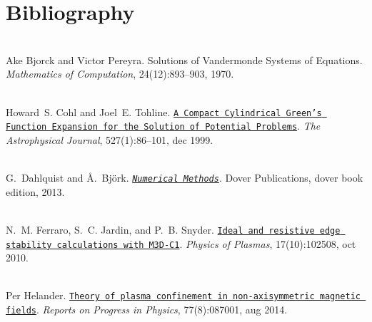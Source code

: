 \chapter{Bibliography }
\hypertarget{citelist}{}\label{citelist}

\begin{DoxyDescription}
\item[{\parbox[t]{\linewidth}{\label{citelist_CITEREF_bjorck1970}%
\Hypertarget{citelist_CITEREF_bjorck1970}%
\+[1]}}]\hfill \\
Ake Bjorck and Victor Pereyra. Solutions of Vandermonde Systems of Equations. {\itshape Mathematics of Computation}, 24(12):893--903, 1970.


\item[{\parbox[t]{\linewidth}{\label{citelist_CITEREF_cohl1999}%
\Hypertarget{citelist_CITEREF_cohl1999}%
\+[2]}}]\hfill \\
Howard~S. Cohl and Joel~E. Tohline. \href{http://stacks.iop.org/0004-637X/527/i=1/a=86}{\texttt{A Compact Cylindrical Green's Function Expansion for the Solution of Potential Problems}}. {\itshape The Astrophysical Journal}, 527(1):86--101, dec 1999. 


\item[{\parbox[t]{\linewidth}{\label{citelist_CITEREF_dahlquist2003numerical}%
\Hypertarget{citelist_CITEREF_dahlquist2003numerical}%
\+[3]}}]\hfill \\
G.~Dahlquist and \AA.~Bj\"{o}rk. \href{http://books.google.es/books?id=armfeHpJIwAC}{\texttt{{\itshape Numerical Methods}}}. Dover Publications, dover book edition, 2013.


\item[{\parbox[t]{\linewidth}{\label{citelist_CITEREF_ferraro2010elmbenchmark}%
\Hypertarget{citelist_CITEREF_ferraro2010elmbenchmark}%
\+[4]}}]\hfill \\
N.~M. Ferraro, S.~C. Jardin, and P.~B. Snyder. \href{http://aip.scitation.org/doi/10.1063/1.3492727}{\texttt{Ideal and resistive edge stability calculations with M3\+D-\/\+C1}}. {\itshape Physics of Plasmas}, 17(10):102508, oct 2010. 


\item[{\parbox[t]{\linewidth}{\label{citelist_CITEREF_helander2014}%
\Hypertarget{citelist_CITEREF_helander2014}%
\+[5]}}]\hfill \\
Per Helander. \href{http://stacks.iop.org/0034-4885/77/i=8/a=087001?key=crossref.bf6909cc443072b7619599e69fafa0da}{\texttt{Theory of plasma confinement in non-\/axisymmetric magnetic fields}}. {\itshape Reports on Progress in Physics}, 77(8):087001, aug 2014. 



\end{DoxyDescription}

